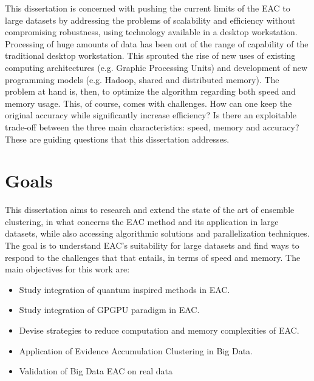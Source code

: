 This dissertation is concerned with pushing the current limits of the EAC to large datasets by addressing the problems of scalability and efficiency without compromising robustness, using technology available in a desktop workstation.
Processing of huge amounts of data has been out of the range of capability of the traditional desktop workstation.
This sprouted the rise of new uses of existing computing architectures (e.g. Graphic Processing Units) and development of new programming models (e.g. Hadoop, shared and distributed memory).
The problem at hand is, then, to  optimize the algorithm regarding both speed and memory usage.
This, of course, comes with challenges.
How can one keep the original accuracy while significantly increase efficiency?
Is there an exploitable trade-off between the three main characteristics: speed, memory and accuracy?
These are guiding questions that this dissertation addresses.


\section{Goals}

This dissertation aims to research and extend the state of the art of ensemble clustering, in what concerns the EAC method and its application in large datasets, while also accessing algorithmic solutions and parallelization techniques.
The goal is to understand EAC's suitability for large datasets and find ways to respond to the challenges that that entails, in terms of speed and memory.
The main objectives for this work are:
\begin{itemize}

\item Study integration of quantum inspired methods in EAC.

\item Study integration of GPGPU paradigm in EAC.

\item Devise strategies to reduce computation and memory complexities of EAC.

\item Application of Evidence Accumulation Clustering in Big Data.

\item Validation of Big Data EAC on real data%
\end{itemize}

